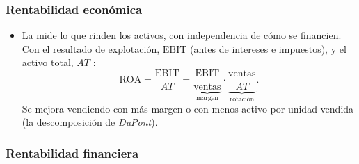 \documentclass[11pt]{article}
\begin{document}
\subsubsection{Rentabilidad económica}\label{sec:roa}

\begin{itemize}
\item La  mide lo que rinden los activos, con independencia de cómo se financien. Con el resultado de explotación, $\mathrm{EBIT}$ (antes de intereses e impuestos), y el activo total, $AT$ :
  \[
  \mathrm{ROA}=\frac{\mathrm{EBIT}}{AT}=\underbrace{\frac{\mathrm{EBIT}}{\text{ventas}}}_{\text{margen}}\cdot\underbrace{\frac{\text{ventas}}{AT}}_{\text{rotación}}.
  \]
  Se mejora vendiendo con más margen o con menos activo por unidad vendida (la descomposición de \emph{DuPont}).
\end{itemize}

\subsubsection{Rentabilidad financiera}\label{sec:roe}
\end{document}
